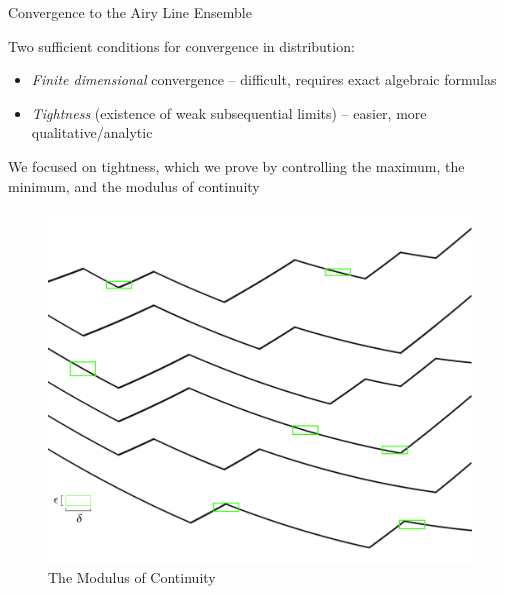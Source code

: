 \documentclass[9pt,t,dvipsnames]{beamer}
\begin{document}
\begin{frame}{Convergence to the Airy Line Ensemble}
	
	Two sufficient conditions for convergence in distribution:
	\begin{itemize}
		
			\item \textit{Finite dimensional} convergence -- difficult, requires exact algebraic formulas
			
			\item \textit{Tightness} (existence of weak subsequential limits) -- easier, more qualitative/analytic
	\end{itemize}

	We focused on tightness, which we prove by controlling the maximum, the minimum, and the modulus of continuity
\begin{figure}
	\includegraphics[height=0.55\textheight]{graphics/ModulusCont.jpg}
	\caption{The Modulus of Continuity}
\end{figure}

\end{frame}
\end{document}
